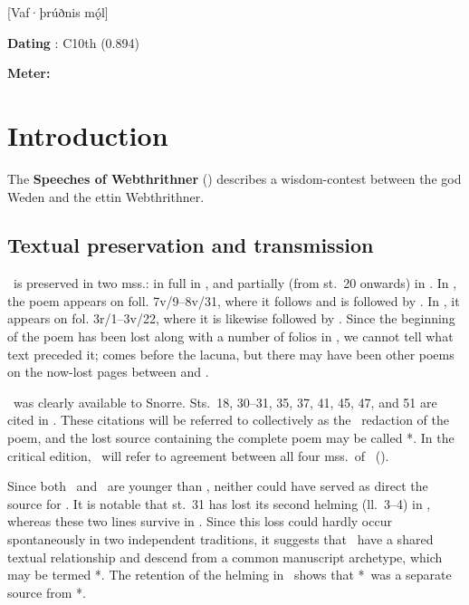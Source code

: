 [Vaf·þrúðnis mǫ́l]

\begin{flushright}%
\textbf{Dating} \parencite{Sapp2022}: C10th (0.894)

\textbf{Meter:} \Ljodahattr%
\end{flushright}%

\section{Introduction}

The \textbf{Speeches of Webthrithner} (\Vafthrudnismal) describes a wisdom-contest between the god Weden and the ettin Webthrithner.

\subsection{Textual preservation and transmission}

\Vafthrudnismal\ is preserved in two mss.: in full in \Regius, and partially (from st.~20 onwards) in \AM.  In \Regius, the poem appears on foll. 7v/9--8v/31, where it follows  and is followed by .  In \AM, it appears on fol. 3r/1--3v/22, where it is likewise followed by .  Since the beginning of the poem has been lost along with a number of folios in \AM, we cannot tell what text preceded it;  comes before the lacuna, but there may have been other poems on the now-lost pages between  and \Vafthrudnismal.

\Vafthrudnismal\ was clearly available to Snorre.  Sts.~18, 30--31, 35, 37, 41, 45, 47, and 51 are cited in \Gylfaginning.  These citations will be referred to collectively as the \GylfMS\ redaction of the poem, and the lost source containing the complete poem may be called *\GylfMS.  In the critical edition, \GylfMS\ will refer to agreement between all four mss.~of \Gylfaginning\ (\RegiusProse\Trajectinus\Wormianus\Upsaliensis).

Since both \Regius\ and \AM\ are younger than \Gylfaginning, neither could have served as direct the source for \GylfMS.  It is notable that st.~31 has lost its second helming (ll.~3--4) in \Regius\AM, whereas these two lines survive in \GylfMS.  Since this loss could hardly occur spontaneously in two independent traditions, it suggests that \Regius\AM\ have a shared textual relationship and descend from a common manuscript archetype, which may be termed *\Regius\AM.  The retention of the helming in \GylfMS\ shows that *\Regius\AM\ was a separate source from *\GylfMS.

